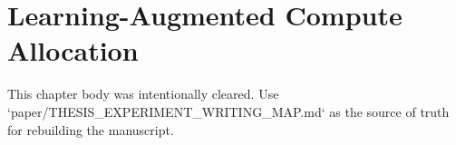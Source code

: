 \chapter{Learning-Augmented Compute Allocation}
\label{ch:learning}

This chapter body was intentionally cleared. Use `paper/THESIS_EXPERIMENT_WRITING_MAP.md` as the source of truth for rebuilding the manuscript.
